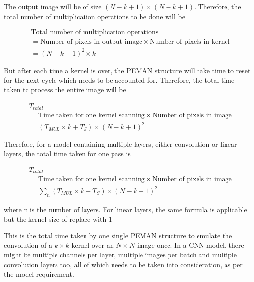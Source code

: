 \documentclass[wide]{adonis}
\begin{document}
The output image will be of size $(N - k + 1) \times (N - k + 1)$. Therefore, the total number of multiplication operations to be done will be

\begin{equation}
	\label{eqn:total_mul_ops}
	\begin{split}
		&\text{Total number of multiplication operations} \\
		&= \text{Number of pixels in output image} \times \text{Number of pixels in kernel} \\
		&= (N - k + 1)^2 \times k
	\end{split}
\end{equation}

But after each time a kernel is over, the PEMAN structure will take time to reset for the next cycle which needs to be accounted for. Therefore, the total time taken to process the entire image will be

\begin{equation}
	\label{eqn:total_time}
	\begin{split}
		&T_{total} \\
		&= \text{Time taken for one kernel scanning} \times \text{Number of pixels in image} \\
		&= (T_{MUL} \times k + T_S) \times (N - k + 1)^2
	\end{split}
\end{equation}

Therefore, for a model containing multiple layers, either convolution or linear layers, the total time taken for one pass is

\begin{equation}
	\label{eqn:total_time_model}
	\begin{split}
		&T_{total} \\
		&= \text{Time taken for one kernel scanning} \times \text{Number of pixels in image} \\
		&= \sum_{n} (T_{MUL} \times k + T_S) \times (N - k + 1)^2
	\end{split}
\end{equation}

where n is the number of layers. For linear layers, the same formula is applicable but the kernel size of replace with 1.

This is the total time taken by one single PEMAN structure to emulate the convolution of a $k \times k$ kernel over an $N  \times N$ image once. In a CNN model, there might be multiple channels per layer, multiple images per batch and multiple convolution layers too, all of which needs to be taken into consideration, as per the model requirement.
\end{document}
